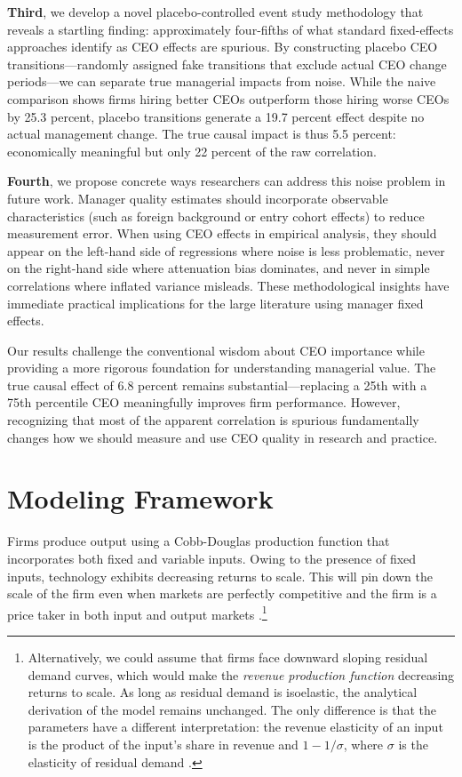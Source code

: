 \documentclass[11pt,a4paper]{article}
\begin{document}
\textbf{Third}, we develop a novel placebo-controlled event study methodology that reveals a startling finding: approximately four-fifths of what standard fixed-effects approaches identify as CEO effects are spurious. By constructing placebo CEO transitions---randomly assigned fake transitions that exclude actual CEO change periods---we can separate true managerial impacts from noise. While the naive comparison shows firms hiring better CEOs outperform those hiring worse CEOs by 25.3 percent, placebo transitions generate a 19.7 percent effect despite no actual management change. The true causal impact is thus 5.5 percent: economically meaningful but only 22 percent of the raw correlation.

\textbf{Fourth}, we propose concrete ways researchers can address this noise problem in future work. Manager quality estimates should incorporate observable characteristics (such as foreign background or entry cohort effects) to reduce measurement error. When using CEO effects in empirical analysis, they should appear on the left-hand side of regressions where noise is less problematic, never on the right-hand side where attenuation bias dominates, and never in simple correlations where inflated variance misleads. These methodological insights have immediate practical implications for the large literature using manager fixed effects.

Our results challenge the conventional wisdom about CEO importance while providing a more rigorous foundation for understanding managerial value. The true causal effect of 6.8 percent remains substantial---replacing a 25th with a 75th percentile CEO meaningfully improves firm performance. However, recognizing that most of the apparent correlation is spurious fundamentally changes how we should measure and use CEO quality in research and practice.


\section{Modeling Framework}
Firms produce output using a Cobb-Douglas production function that incorporates both fixed and variable inputs. Owing to the presence of fixed inputs, technology exhibits decreasing returns to scale. This will pin down the scale of the firm even when markets are perfectly competitive and the firm is a price taker in both input and output markets \citep{AtkesonKehoe2005JPE,McGrattan2012RED}.\footnote{Alternatively, we could assume that firms face downward sloping residual demand curves, which would make the \emph{revenue production function} decreasing returns to scale. As long as residual demand is isoelastic, the analytical derivation of the model remains unchanged. The only difference is that the parameters have a different interpretation: the revenue elasticity of an input is the product of the input's share in revenue and $1-1/\sigma$, where $\sigma$ is the elasticity of residual demand \citep{DeLoecker2011Econometrica}.}
\end{document}
